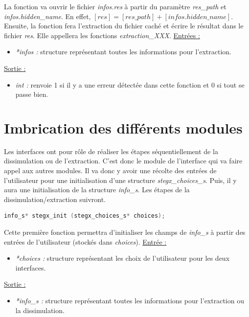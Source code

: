 \documentclass[11pt]{article}
\begin{document}
La fonction va ouvrir le fichier \textit{infos.res} à partir du paramètre
\textit{res\_path} et \textit{infos.hidden\_name}. 
En effet, $[res] = [res\_path] + [infos.hidden\_name]$.
Ensuite, la fonction fera l'extraction du fichier caché et écrire le résultat 
dans le fichier \textit{res}. 
Elle appellera les fonctions \textit{extraction\_XXX}. 
\newline
\underline{Entrées :} 
\begin{itemize}
\item \textit{*infos :} structure représentant toutes les informations pour 
l'extraction.  
\end{itemize}
\underline{Sortie :} 
\begin{itemize}
\item \textit{int :} renvoie 1 si il y a une erreur détectée dans cette 
fonction et 0 si tout se passe bien.  
\newline 
\end{itemize}

\section{Imbrication des différents modules}

Les interfaces ont pour rôle de réaliser les étapes séquentiellement 
de la dissimulation ou de l'extraction. C'est donc le module de l’interface qui 
va faire appel aux autres modules. 
Il va donc y avoir une récolte des entrées de l'utilisateur pour une 
initialisation d'une structure \textit{stegx\_choices\_s}. 
Puis, il y aura une initialisation de la structure \textit{info\_s}. 
Les étapes de la dissimulation/extraction suivront. \newline

\begin{lstlisting}[language=c]
info_s* stegx_init (stegx_choices_s* choices);
\end{lstlisting}

Cette première fonction permettra d'initialiser les champs de \textit{info\_s} 
à partir des entrées de l'utilisateur (stockés dans \textit{choices}). 
\newline
\underline{Entrée :} 
\begin{itemize}
\item \textit{*choices :} structure représentant les choix de 
l'utilisateur pour les deux interfaces. 
\end{itemize}
\underline{Sortie :} 
\begin{itemize}
\item \textit{*info\_s :} structure représentant toutes les informations 
pour l'extraction ou la dissimulation.   
\newline 
\end{itemize}
\end{document}
